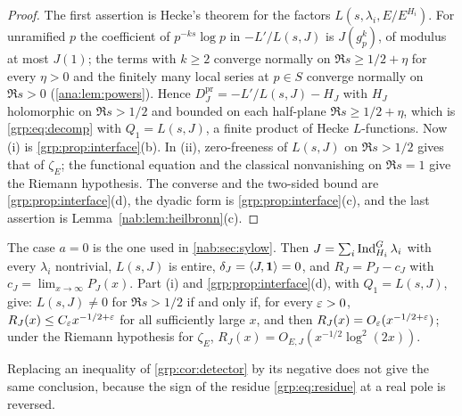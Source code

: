 \begin{proof}
The first assertion is Hecke's theorem for the factors $L(s,\lambda_i,E/E^{H_i})$.
For unramified $p$ the coefficient of $p^{-ks}\log p$ in $-L'/L(s,J)$ is
$J(g_p^k)$, of modulus at most $J(1)$; the terms with $k\ge2$ converge
normally on $\Re s\ge1/2+\eta$ for every $\eta>0$ and the finitely many local
series at $p\in S$ converge normally on $\Re s>0$ (\cref{ana:lem:powers}).
Hence $D^{\mathrm{pr}}_J=-L'/L(s,J)-H_J$ with $H_J$ holomorphic on $\Re s>1/2$ and
bounded on each half-plane $\Re s\ge1/2+\eta$, which is \eqref{grp:eq:decomp} with
$Q_1=L(s,J)$, a finite product of Hecke $L$-functions. Now (i) is
\cref{grp:prop:interface}(b). In (ii), zero-freeness of $L(s,J)$ on
$\Re s>1/2$ gives that of $\zeta_E$; the functional equation and the classical
nonvanishing on $\Re s=1$ give the Riemann hypothesis. The converse and the
two-sided bound are \cref{grp:prop:interface}(d), the dyadic form is
\cref{grp:prop:interface}(c), and the last assertion is
Lemma~\ref{nab:lem:heilbronn}(c).
\end{proof}

The case $a=0$ is the one used in \cref{nab:sec:sylow}. Then
$J=\sum_i\operatorname{Ind}_{H_i}^G\lambda_i$ with every $\lambda_i$ nontrivial, $L(s,J)$ is entire,
$\delta_J=\langle J,\mathbf{1}\rangle=0$, and $R_J=P_J-c_J$ with $c_J=\lim_{x\to\infty}P_J(x)$.
Part (i) and \cref{grp:prop:interface}(d), with $Q_1=L(s,J)$, give: $L(s,J)\ne0$ for
$\Re s>1/2$ if and only if, for every $\varepsilon>0$, $R_J(x)\le C_\varepsilon x^{-1/2+\varepsilon}$ for all
sufficiently large $x$, and then $R_J(x)=O_\varepsilon(x^{-1/2+\varepsilon})$; under the Riemann
hypothesis for $\zeta_E$, $R_J(x)=O_{E,J}(x^{-1/2}\log^2(2x))$.

Replacing an inequality of \cref{grp:cor:detector} by its negative does not
give the same conclusion, because the sign of the residue
\eqref{grp:eq:residue} at a real pole is reversed.

